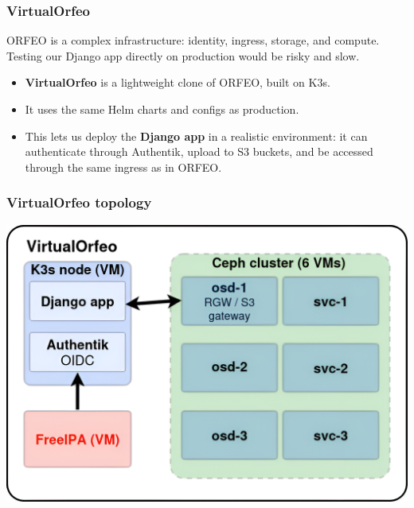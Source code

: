 \documentclass{beamer}
\begin{document}
	\begin{frame}
		\frametitle{VirtualOrfeo}
		
		ORFEO is a complex infrastructure: identity, ingress, storage, and compute.  
		Testing our Django app directly on production would be risky and slow.
		
		\vspace{1em}
		\begin{itemize}
			\item \textbf{VirtualOrfeo} is a lightweight clone of ORFEO, built on K3s.
			\item It uses the same Helm charts and configs as production.
			\item This lets us deploy the \textbf{Django app} in a realistic environment:
			it can authenticate through Authentik, upload to S3 buckets,
			and be accessed through the same ingress as in ORFEO.
		\end{itemize}
	\end{frame}
	
	\begin{frame}
		\frametitle{VirtualOrfeo topology}
		\includegraphics[width=\textwidth]{otherResources/VirtualOrfeo_topology.png}
	\end{frame}
	
	
\end{document}
